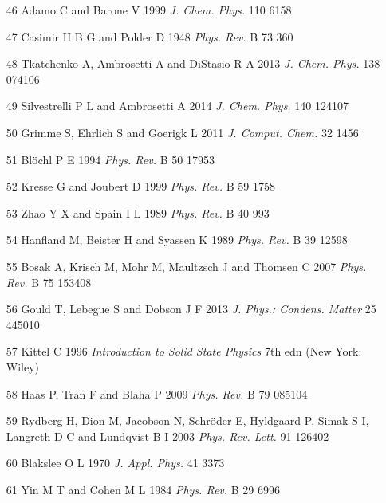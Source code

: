 \documentclass{article}
\begin{document}
\begin{itemize}
\item 
[46] Adamo C and Barone V 1999 \textit{J. Chem. Phys.} 110 6158

\item 
[47] Casimir H B G and Polder D 1948 \textit{Phys. Rev.} B 73 360

\item 
[48] Tkatchenko A, Ambrosetti A and DiStasio R A 2013 \textit{J. Chem. Phys.} 138 074106

\item 
[49] Silvestrelli P L and Ambrosetti A 2014 \textit{J. Chem. Phys.} 140 124107

\item 
[50] Grimme S, Ehrlich S and Goerigk L 2011 \textit{J. Comput. Chem.} 32 1456

\item 
[51] Blöchl P E 1994 \textit{Phys. Rev.} B 50 17953

\item 
[52] Kresse G and Joubert D 1999 \textit{Phys. Rev.} B 59 1758

\item 
[53] Zhao Y X and Spain I L 1989 \textit{Phys. Rev.} B 40 993

\item 
[54] Hanfland M, Beister H and Syassen K 1989 \textit{Phys. Rev.} B 39 12598

\item 
[55] Bosak A, Krisch M, Mohr M, Maultzsch J and Thomsen C 2007 \textit{Phys. Rev.} B 75 153408

\item 
[56] Gould T, Lebegue S and Dobson J F 2013 \textit{J. Phys.: Condens. Matter} 25 445010

\item 
[57] Kittel C 1996 \textit{Introduction to Solid State Physics} 7th edn (New York: Wiley)

\item 
[58] Haas P, Tran F and Blaha P 2009 \textit{Phys. Rev.} B 79 085104

\item 
[59] Rydberg H, Dion M, Jacobson N, Schröder E, Hyldgaard P, Simak S I, Langreth D C and Lundqvist B I 2003 \textit{Phys. Rev. Lett.} 91 126402

\item 
[60] Blakslee O L 1970 \textit{J. Appl. Phys.} 41 3373

\item 
[61] Yin M T and Cohen M L 1984 \textit{Phys. Rev.} B 29 6996


\end{itemize}
\end{document}
